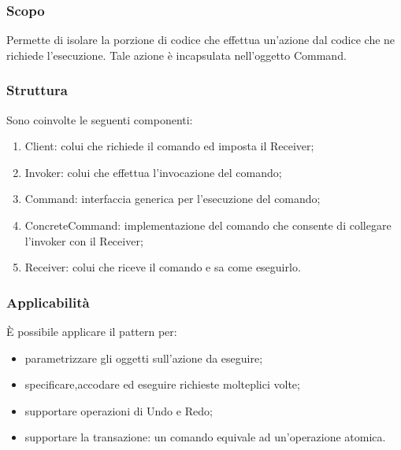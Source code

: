\subsubsection{Scopo} Permette di isolare la porzione di codice che effettua un'azione dal codice che ne richiede l'esecuzione. Tale azione è incapsulata nell'oggetto Command.

\subsubsection{Struttura} Sono coinvolte le seguenti componenti:
\begin{enumerate}
	\item Client: colui che richiede il comando  ed imposta il Receiver;
	\item Invoker: colui che effettua l'invocazione del comando;
	\item Command: interfaccia generica per l'esecuzione del comando;
	\item ConcreteCommand: implementazione del comando che consente di collegare l'invoker con il Receiver;
	\item Receiver: colui che riceve il comando e sa come eseguirlo.
\end{enumerate}

\subsubsection{Applicabilità} È possibile applicare il pattern per:
\begin{itemize}
	\item parametrizzare gli oggetti sull'azione da eseguire;
	\item specificare,accodare ed eseguire richieste molteplici volte;
	\item supportare operazioni di Undo e Redo;
	\item supportare la transazione: un comando equivale ad un'operazione atomica.
\end{itemize}
